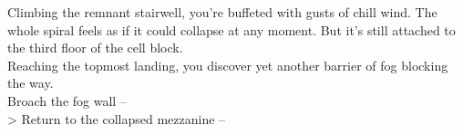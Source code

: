 Climbing the remnant stairwell, you’re buffeted with gusts of chill wind. The whole spiral feels as if it could collapse at any moment. But it’s still attached to the third floor of the cell block.\\

Reaching the topmost landing, you discover yet another barrier of fog blocking the way.\\

 Broach the fog wall -- \\
> Return to the collapsed mezzanine -- 